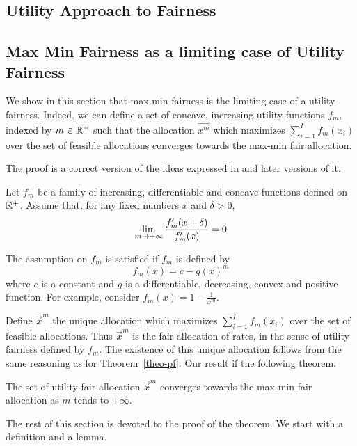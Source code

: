 \subsection{Utility Approach to Fairness}

\subsection{Max Min Fairness as a limiting case of Utility Fairness}
We show in this section that max-min fairness is the limiting case
of a utility fairness. Indeed, we can define a set of concave,
increasing utility functions $f_m$, indexed by $m \in \Bbb{R}^+$
such that the allocation $\vec{x^m}$ which maximizes
$\sum_{i=1}^{I} f_m(x_i)$ over the set of feasible allocations
converges towards the max-min fair allocation.

The proof is a correct version of the ideas expressed in
\cite{mo-98-a} and later versions of it.

Let $f_m$ be a family of increasing, differentiable and concave
functions defined on $\Bbb{R}^+$. Assume that, for any fixed
numbers $x$ and $\delta
>0$,
\begin{equation}\mylabel{eq-deffm}
  \lim_{m \rightarrow + \infty} \frac{f'_m(x+\delta)}{f'_m(x)}=0
\end{equation}

The assumption on $f_m$ is satisfied if $f_m$ is defined by
 $$f_m(x) = c - g(x)^m
 $$
where $c$ is a constant and $g$ is a differentiable, decreasing,
convex and positive function. For example, consider
 $f_m(x) = 1 - \frac{1}{x^m}$.

Define $\vec{x}^m$ the unique allocation which maximizes
$\sum_{i=1}^{I} f_m(x_i)$ over the set of feasible allocations.
Thus  $\vec{x}^m$ is the fair allocation of rates, in the sense of
utility fairness defined by $f_m$. The existence of this unique
allocation follows from the same reasoning as for
Theorem~\ref{theo-pf}. Our result if the following theorem.

\begin{theorem}
 The set of utility-fair allocation
$\vec{x}^m$ converges towards the max-min fair allocation as $m$
tends to $+\infty$.
\end{theorem}
The rest of this section is devoted to the proof of the theorem.
We start with a definition and a lemma.

